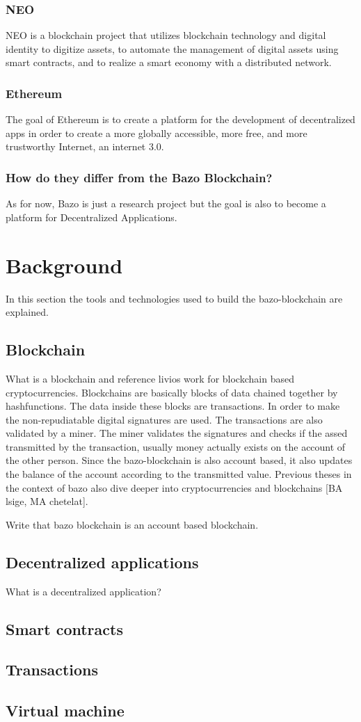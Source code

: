 \subsubsection{NEO}
NEO is a blockchain project \frqq that utilizes blockchain technology and digital identity to digitize assets, to automate the management of digital assets using smart contracts, and to realize a smart economy with a distributed network.\frqq \cite{neovseth}

\subsubsection{Ethereum}
The goal of Ethereum is to create a platform for the development of decentralized apps in order to create a \frqq more globally accessible, more free, and more trustworthy Internet, an internet 3.0\frqq. \cite{neovseth}

\subsubsection{How do they differ from the Bazo Blockchain?}
As for now, Bazo is just a research project but the goal is also to become a platform for Decentralized Applications.

\section{Background}
In this section the tools and technologies used to build the bazo-blockchain are explained.

\subsection{Blockchain}
What is a blockchain and reference livios work for blockchain based cryptocurrencies. Blockchains are basically blocks of data chained together by hashfunctions. The data inside these blocks are transactions. In order to make the non-repudiatable digital signatures are used. The transactions are also validated by a miner. The miner validates the signatures and checks if the assed transmitted by the transaction, usually money actually exists on the account of the other person. Since the bazo-blockchain is also account based, it also updates the balance of the account according to the transmitted value. Previous theses in the context of bazo also dive deeper into cryptocurrencies and blockchains [BA lsige, MA chetelat].

Write that bazo blockchain is an account based blockchain.

\subsection{Decentralized applications}
What is a decentralized application? 

\subsection{Smart contracts}

\subsection{Transactions}

\subsection{Virtual machine}
